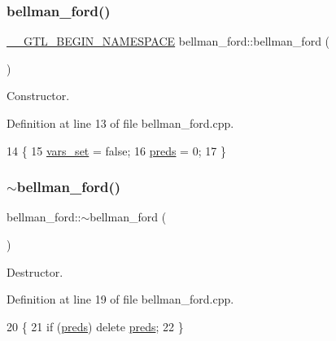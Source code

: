 \subsubsection{\texorpdfstring{bellman\+\_\+ford()}{bellman\_ford()}}
{\footnotesize\ttfamily \mbox{\hyperlink{_g_t_l_8h_a2d9f24096ac60918452dd51f32b64aa9}{\+\_\+\+\_\+\+G\+T\+L\+\_\+\+B\+E\+G\+I\+N\+\_\+\+N\+A\+M\+E\+S\+P\+A\+CE}} bellman\+\_\+ford\+::bellman\+\_\+ford (\begin{DoxyParamCaption}{ }\end{DoxyParamCaption})}



Constructor. 



Definition at line 13 of file bellman\+\_\+ford.\+cpp.


\begin{DoxyCode}
14 \{
15     \mbox{\hyperlink{classbellman__ford_a0b727de83366d019041694f890f19dbb}{vars\_set}} = \textcolor{keyword}{false};
16     \mbox{\hyperlink{classbellman__ford_a1ce37529c697ec5b89e8dc09204e4f59}{preds}} = 0;
17 \}
\end{DoxyCode}
\mbox{\label{classbellman__ford_a8461c6b8d7663b05a97b6d270347a49c}} 
\subsubsection{\texorpdfstring{$\sim$bellman\+\_\+ford()}{~bellman\_ford()}}
{\footnotesize\ttfamily bellman\+\_\+ford\+::$\sim$bellman\+\_\+ford (\begin{DoxyParamCaption}{ }\end{DoxyParamCaption})\hspace{0.3cm}{\ttfamily [virtual]}}



Destructor. 



Definition at line 19 of file bellman\+\_\+ford.\+cpp.


\begin{DoxyCode}
20 \{
21     \textcolor{keywordflow}{if} (\mbox{\hyperlink{classbellman__ford_a1ce37529c697ec5b89e8dc09204e4f59}{preds}}) \textcolor{keyword}{delete} \mbox{\hyperlink{classbellman__ford_a1ce37529c697ec5b89e8dc09204e4f59}{preds}};
22 \}
\end{DoxyCode}


